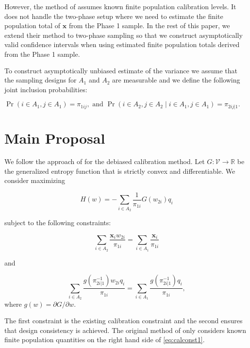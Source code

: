\documentclass[12pt]{article}
\newcommand{\R}{\mathbb{R}}
\renewcommand{\bf}[1]{\mathbf{#1}}
\begin{document}
However, the method of \cite{kwon2024debiased} assumes known finite population 
calibration levels. It does not handle the
two-phase setup where we need to estimate the finite population total of $\bf x$
from the Phase 1 sample. In the rest of this paper, we extend their method to 
two-phase sampling so that we construct asymptotically valid confidence
intervals when using estimated finite population totals derived from the Phase 1
sample.

To construct asymptotically unbiased estimate of the variance we assume that the
sampling designs for $A_1$ and $A_2$ are measurable and we define the following
joint inclusion probabilities:

$\Pr(i \in A_1, j \in A_1) = \pi_{1ij}, \text{ and }
\Pr(i \in A_2, j \in A_2 \mid i \in A_1, j \in A_1) = \pi_{2ij|1}.$

\section{Main Proposal}

We follow the approach of \cite{kwon2024debiased} for the debiased calibration
method.  Let $G: \mathcal{V} \to \R$ be the generalized entropy function that is
strictly convex and differentiable. We consider maximizing 

\begin{equation}\label{eq:primalloss}
  H(w) = - \sum_{i \in A_2} \frac{1}{\pi_{1i}} G(w_{2i}) q_i
\end{equation}

subject to the following constraints:

\begin{equation}\label{eq:calconst1}
  \sum_{i \in A_2} \frac{\bf x_i w_{2i}}{\pi_{1i}} = 
\sum_{i \in A_1} \frac{\bf x_i}{\pi_{1i}}
\end{equation}

and 

\begin{equation}\label{eq:calconst2}
  \sum_{i \in A_2} \frac{g(\pi_{2i|1}^{-1})w_{2i}q_i}{\pi_{1i}} = 
  \sum_{i \in A_1} \frac{g(\pi_{2i|1}^{-1})q_i}{\pi_{1i}}, 
\end{equation}
where $g(w) = \partial G / \partial w$. 

The first constraint is the existing calibration constraint and the second
ensures that design consistency is achieved. 
The original method of \cite{kwon2024debiased} only considers known finite
population quantities on the right hand side of \eqref{eq:calconst1}.
\end{document}

